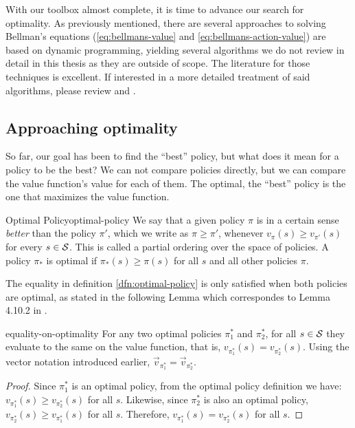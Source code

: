With our toolbox almost complete, it is time to advance our search for
optimality. As previously mentioned, there are several approaches to solving
Bellman's equations (\eqref{eq:bellmans-value} and
\eqref{eq:bellmans-action-value}) are based on dynamic programming, yielding
several algorithms we do not review in detail in this thesis as they are outside
of scope. The literature for those techniques is excellent. If interested in a
more detailed treatment of said algorithms, please review \cite{SuttonBarto} and
\cite{raoRL4F}.

\subsection{Approaching optimality}

So far, our goal has been to find the ``best'' policy, but what does it mean for
a policy to be the best? We can not compare policies directly, but we can
compare the value function's value for each of them. The optimal, the
``best'' policy is the one that maximizes the value function.

\begin{dfn}{Optimal Policy}{optimal-policy}
    We say that a given policy $\pi$ is in a certain sense \textit{better} than
    the policy $\pi'$, which we write as $\pi \geq \pi'$, whenever $v_\pi(s)
    \geq v_{\pi'} (s)$ for every $s \in \mathcal{S}$. This is called a partial
    ordering over the space of policies. A policy $\pi_*$ is optimal if
    $\pi_*(s) \geq \pi (s)$ for all $s$ and all other policies $\pi$.
\end{dfn}

The equality in definition \ref{dfn:optimal-policy} is only satisfied when both
policies are optimal, as stated in the following Lemma which correspondes to
Lemma 4.10.2 in \cite[pg.~115]{raoRL4F}.

\begin{lemma}{}{equality-on-optimality}
    For any two optimal policies $\pi^{*}_{1}$ and $\pi^{*}_{2}$, for all $s \in
    \mathcal{S}$ they evaluate to the same on the value function, that is,
    $v_{\pi^{*}_{1}} (s) = v_{\pi^{*}_{2}} (s)$.  Using the vector notation
    introduced earlier, $\vec{v}_{\pi_{1}^{*}} = \vec{v}_{\pi_{2}^{*}}$.
\end{lemma}

\begin{proof}
    Since $\pi_{1}^{*}$ is an optimal policy, from the optimal policy definition
    we have: $v_{\pi_{1}^{*}}(s) \geq v_{\pi_{2}^{*}} (s)$ for all $s$.
    Likewise, since $\pi_{2}^{*}$ is also an optimal policy, $v_{\pi_{2}^{*}}(s)
    \geq v_{\pi_{1}^{*}} (s)$ for all $s$. Therefore, $v_{\pi_{1}^{*}}(s) =
    v_{\pi_{2}^{*}} (s)$ for all $s$.
\end{proof}

